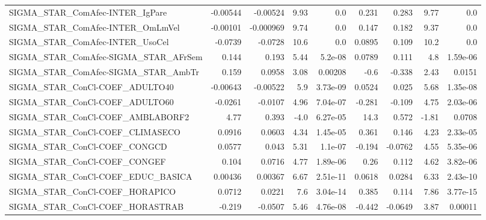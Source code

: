 \begin{tabular}{lrrrrrrrr}
SIGMA\_STAR\_ComAfec-INTER\_IgPare       &    -0.00544 &     -0.00524 &     9.93 &      0.0 &      0.231 &       0.283 &         9.77 &           0.0 \\
SIGMA\_STAR\_ComAfec-INTER\_OmLmVel      &    -0.00101 &    -0.000969 &     9.74 &      0.0 &      0.147 &       0.182 &         9.37 &           0.0 \\
SIGMA\_STAR\_ComAfec-INTER\_UsoCel       &     -0.0739 &      -0.0728 &     10.6 &      0.0 &     0.0895 &       0.109 &         10.2 &           0.0 \\
SIGMA\_STAR\_ComAfec-SIGMA\_STAR\_AFrSem  &       0.144 &        0.193 &     5.44 &  5.2e-08 &     0.0789 &       0.111 &          4.8 &      1.59e-06 \\
SIGMA\_STAR\_ComAfec-SIGMA\_STAR\_AmbTr   &       0.159 &       0.0958 &     3.08 &  0.00208 &       -0.6 &      -0.338 &         2.43 &        0.0151 \\
SIGMA\_STAR\_ConCl-COEF\_ADULTO40        &    -0.00643 &     -0.00522 &      5.9 & 3.73e-09 &     0.0524 &       0.025 &         5.68 &      1.35e-08 \\
SIGMA\_STAR\_ConCl-COEF\_ADULTO60        &     -0.0261 &      -0.0107 &     4.96 & 7.04e-07 &     -0.281 &      -0.109 &         4.75 &      2.03e-06 \\
SIGMA\_STAR\_ConCl-COEF\_AMBLABORF2      &        4.77 &        0.393 &     -4.0 & 6.27e-05 &       14.3 &       0.572 &        -1.81 &        0.0708 \\
SIGMA\_STAR\_ConCl-COEF\_CLIMASECO       &      0.0916 &       0.0603 &     4.34 & 1.45e-05 &      0.361 &       0.146 &         4.23 &      2.33e-05 \\
SIGMA\_STAR\_ConCl-COEF\_CONGCD          &      0.0577 &        0.043 &     5.31 &  1.1e-07 &     -0.194 &     -0.0762 &         4.55 &      5.35e-06 \\
SIGMA\_STAR\_ConCl-COEF\_CONGEF          &       0.104 &       0.0716 &     4.77 & 1.89e-06 &       0.26 &       0.112 &         4.62 &      3.82e-06 \\
SIGMA\_STAR\_ConCl-COEF\_EDUC\_BASICA     &     0.00436 &      0.00367 &     6.67 & 2.51e-11 &     0.0618 &      0.0284 &         6.33 &      2.43e-10 \\
SIGMA\_STAR\_ConCl-COEF\_HORAPICO        &      0.0712 &       0.0221 &      7.6 & 3.04e-14 &      0.385 &       0.114 &         7.86 &      3.77e-15 \\
SIGMA\_STAR\_ConCl-COEF\_HORASTRAB       &      -0.219 &      -0.0507 &     5.46 & 4.76e-08 &     -0.442 &     -0.0649 &         3.87 &       0.00011 \\

\end{tabular}
